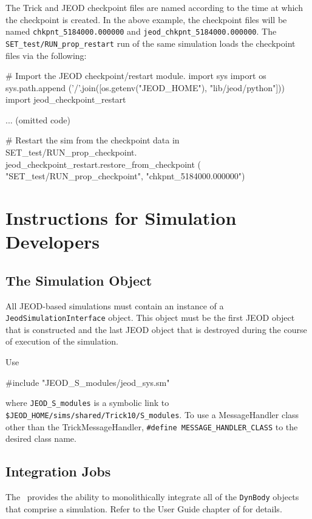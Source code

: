The Trick and JEOD checkpoint files are named according to the time at which the
checkpoint is created. In the above example, the checkpoint files will be named
\verb|chkpnt_5184000.000000| and \verb|jeod_chkpnt_5184000.000000|. The
\verb|SET_test/RUN_prop_restart| run of the same simulation loads the checkpoint
files via the following:
\begin{codeblock}
# Import the JEOD checkpoint/restart module.
import sys
import os
sys.path.append ('/'.join([os.getenv("JEOD_HOME"), "lib/jeod/python"]))
import jeod_checkpoint_restart

... (omitted code)

# Restart the sim from the checkpoint data in SET_test/RUN_prop_checkpoint.
jeod_checkpoint_restart.restore_from_checkpoint (
  "SET_test/RUN_prop_checkpoint", "chkpnt_5184000.000000")
\end{codeblock}

\section{Instructions for Simulation Developers}
\label{sec:sim_developer_instructions}
\subsection{The  Simulation Object}
\label{sec:guide_jeod_sys}
All JEOD-based simulations must contain an instance of a
\verb|JeodSimulationInterface| object.
This object must be the first JEOD object that is constructed and
the last JEOD object that is destroyed during the course of execution of the
simulation.

Use
\begin{codeblock}
#include "JEOD_S_modules/jeod_sys.sm"
\end{codeblock}
where \verb|JEOD_S_modules| is a symbolic link to
\verb|$JEOD_HOME/sims/shared/Trick10/S_modules|.
To use a MessageHandler class  other than the TrickMessageHandler,
\verb|#define MESSAGE_HANDLER_CLASS| to the desired class name.

\subsection{Integration Jobs}
\label{sec:guide_integ}
The \DYNMANAGER\ provides the ability to monolithically integrate all of the
\verb|DynBody| objects that comprise a simulation.
Refer to the User Guide chapter of
 for details.

